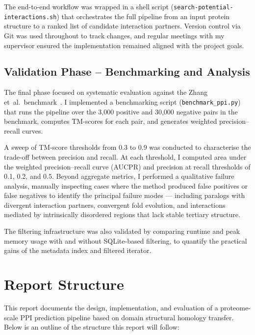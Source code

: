 The end-to-end workflow was wrapped in a shell script (\texttt{search-potential-interactions.sh}) that orchestrates the full pipeline from an input protein structure to a ranked list of candidate interaction partners.
Version control via Git was used throughout to track changes, and regular meetings with my supervisor ensured the implementation remained aligned with the project goals.

\subsection{Validation Phase -- Benchmarking and Analysis}

The final phase focused on systematic evaluation against the Zhang et~al.\ benchmark~\cite{zhang2025ppi}.
I implemented a benchmarking script (\texttt{benchmark\_ppi.py}) that runs the pipeline over the 3{,}000 positive and 30{,}000 negative pairs in the benchmark, computes TM-scores for each pair, and generates weighted precision--recall curves.

A sweep of TM-score thresholds from 0.3 to 0.9 was conducted to characterise the trade-off between precision and recall.
At each threshold, I computed area under the weighted precision--recall curve (AUCPR) and precision at recall thresholds of 0.1, 0.2, and 0.5.
Beyond aggregate metrics, I performed a qualitative failure analysis, manually inspecting cases where the method produced false positives or false negatives to identify the principal failure modes --- including paralogs with divergent interaction partners, convergent fold evolution, and interactions mediated by intrinsically disordered regions that lack stable tertiary structure.

The filtering infrastructure was also validated by comparing runtime and peak memory usage with and without SQLite-based filtering, to quantify the practical gains of the metadata index and filtered iterator.


\section{Report Structure}
\label{sec:intro-report-structure}

This report documents the design, implementation, and evaluation of a proteome-scale PPI prediction pipeline based on domain structural homology transfer.
Below is an outline of the structure this report will follow:

